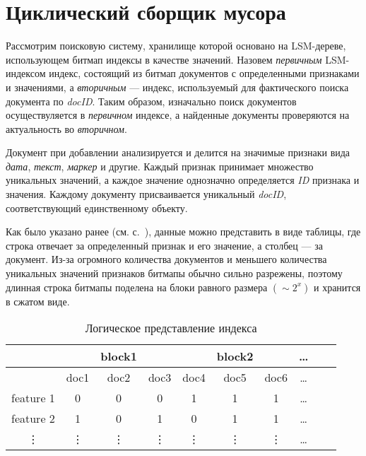 \newpage
\section{Циклический сборщик мусора}
\label{section:dangling}

Рассмотрим поисковую систему, хранилище которой основано на LSM-дереве,
использующем битмап индексы в качестве значений. Назовем \textit{первичным}
LSM-индексом индекс, состоящий из битмап документов с определенными признаками
и значениями, а \textit{вторичным} — индекс, используемый для фактического
поиска документа по \textit{docID}. Таким образом, изначально поиск документов
осуществуляется в \textit{первичном} индексе, а найденные документы проверяются
на актуальность во \textit{вторичном}.

Документ при добавлении анализируется и делится на значимые признаки вида
\textit{дата}, \textit{текст}, \textit{маркер} и другие. Каждый признак
принимает множество уникальных значений, а каждое значение однозначно определяется
\textit{ID} признака и значения. Каждому документу присваивается уникальный
\textit{docID}, соответствующий единственному объекту.

Как было указано ранее (см. с.~\pageref{table}), данные можно представить в виде
таблицы, где строка отвечает за определенный признак и его значение, а столбец
— за документ. Из-за огромного количества документов и меньшего количества
уникальных значений признаков битмапы обычно сильно разрежены, поэтому длинная
строка битмапы поделена на блоки равного размера $(\sim 2^{x})$ и хранится в
сжатом виде.

\begin{table}[H]
\caption{Логическое представление индекса}
\centering
\small
\singlespacing
\begin{tabular}{|c|c|c|c|c|c|c|c|c|c|}
    \hline
                &       & block1&       &       & block2    &       & \ldots \\ \hline
                & doc1  & doc2  & doc3  & doc4  & doc5      & doc6  & \ldots \\ \hline
    feature 1   & 0     & 0     & 0     & 1     & 1         & 1     & \ldots \\ \hline
    feature 2   & 1     & 0     & 1     & 0     & 1         & 1     & \ldots \\ \hline
    \vdots      & \vdots& \vdots& \vdots& \vdots& \vdots    &\vdots & \ldots \\ \hline
\end{tabular}
\label{index}
\end{table}

